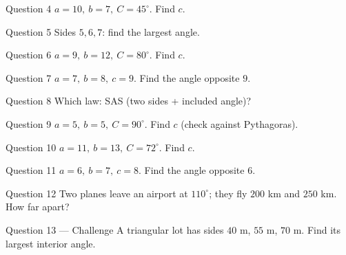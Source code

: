\documentclass[11pt]{article}
\begin{document}
\begin{qbox}{Question 4}
$a=10,\ b=7,\ C=45^\circ$. Find $c$.\workspace{2.4cm}
\end{qbox}

\begin{qbox}{Question 5}
Sides $5,6,7$: find the largest angle.\workspace{2.4cm}
\end{qbox}

\begin{qbox}{Question 6}
$a=9,\ b=12,\ C=80^\circ$. Find $c$.\workspace{2.4cm}
\end{qbox}

\begin{qbox}{Question 7}
$a=7,\ b=8,\ c=9$. Find the angle opposite $9$.\workspace{2.4cm}
\end{qbox}

\begin{qbox}{Question 8}
Which law: SAS (two sides + included angle)?\workspace{2.4cm}
\end{qbox}

\begin{qbox}{Question 9}
$a=5,\ b=5,\ C=90^\circ$. Find $c$ (check against Pythagoras).\workspace{2.4cm}
\end{qbox}

\begin{qbox}{Question 10}
$a=11,\ b=13,\ C=72^\circ$. Find $c$.\workspace{2.4cm}
\end{qbox}

\begin{qbox}{Question 11}
$a=6,\ b=7,\ c=8$. Find the angle opposite $6$.\workspace{2.4cm}
\end{qbox}

\begin{qbox}{Question 12}
Two planes leave an airport at $110^\circ$; they fly $200$ km and $250$ km. How far apart?\workspace{2.6cm}
\end{qbox}

\begin{qbox}{Question 13 --- Challenge}
A triangular lot has sides $40$ m, $55$ m, $70$ m. Find its largest interior angle.\workspace{3cm}
\end{qbox}

\clearpage
{}
\end{document}
